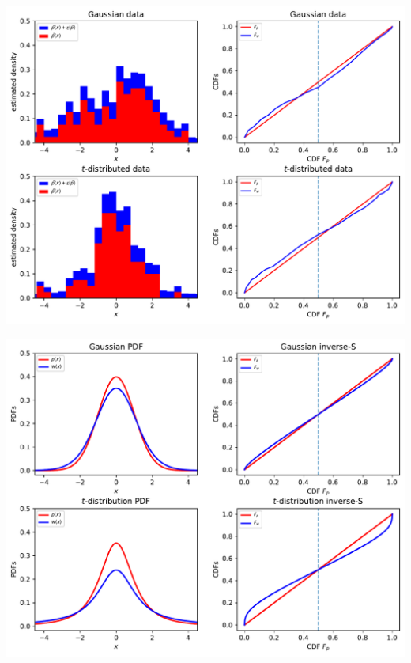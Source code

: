 \begin{frame}
\begin{center}
  \includegraphics[width=.8\textwidth]{../../figs/dm_count_sim}
\end{center}
\end{frame}

\begin{frame}
\begin{center}
	\includegraphics[width=.8\textwidth]{../../figs/square_root_error}
\end{center}

\end{frame}


